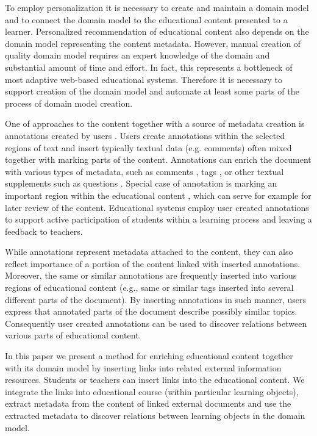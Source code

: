 \documentclass[a4, conference]{IEEEtran}
\begin{document}
To employ personalization it is necessary to create and maintain a domain model and to connect the domain model to the educational content presented to a learner. Personalized recommendation of educational content also depends on the domain model representing the content metadata. However, manual creation of quality domain model requires an expert knowledge of the domain and substantial amount of time and effort. In fact, this represents a bottleneck of most adaptive web-based educational systems. Therefore it is necessary to support creation of the domain model and automate at least some parts of the process of domain model creation.

One of approaches to the content together with a source of metadata creation is annotations created by users \cite{ref:barlatowards,ref:moro2011towards }.%
Users create annotations within the selected regions of text and insert typically textual data (e.g. comments) often mixed together with marking parts of the content. Annotations can enrich the document with various types of metadata, such as comments \cite{ref:bielikova2010alef }, tags \cite{ref:bao2007optimizing }, or other textual supplements such as questions \cite{ref:unvcik2010annotating }. Special case of annotation is marking an important region within the educational content \cite{ref:kim2008spatial }, which can serve for example for later review of the content. Educational systems employ user created annotations to support active participation of students within a learning process \cite{ref:vsimko2011supporting } and leaving a feedback to teachers.

While annotations represent metadata attached to the content, they can also reflect importance of a portion of the content linked with inserted annotations. Moreover, the same or similar annotations are frequently inserted into various regions of educational content (e.g., same or similar tags inserted into several different parts of the document). By inserting annotations in such manner, users express that annotated parts of the document describe possibly similar topics. Consequently user created annotations can be used to discover relations between various parts of educational content.

In this paper we present a method for enriching educational content together with its domain model by inserting links into related external information resources. Students or teachers can insert links into the educational content. We integrate the links into educational course (within particular learning objects), extract metadata from the content of linked external documents and use the extracted metadata to discover relations between learning objects in the domain model.
\end{document}
